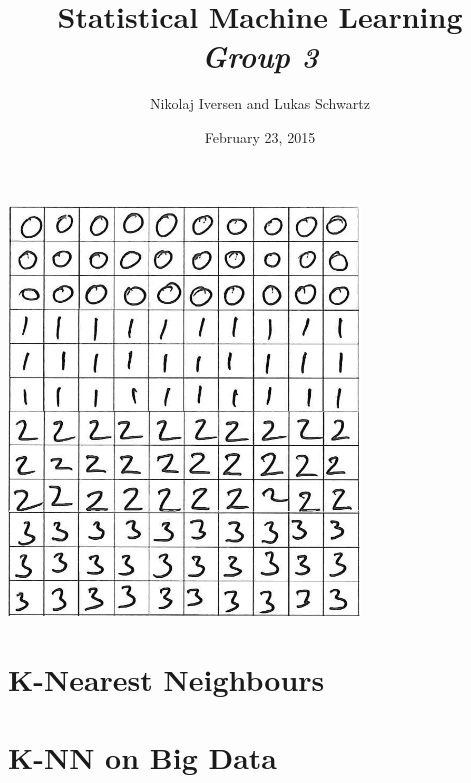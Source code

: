 \documentclass[12pt,a4paper]{article}
\begin{document}
\title{Statistical Machine Learning\\{\large\emph{Group 3}}}
\author{Nikolaj Iversen and Lukas Schwartz}
\date{February 23, 2015}
\maketitle

\vfill
\begin{center}
\includegraphics[width=0.7\textwidth]{graphics/digit_example}
\end{center}

\newpage

\tableofcontents
\listoffigures
\listoftables

\newpage


\section{K-Nearest Neighbours}

% 


% 

% 

\section{K-NN on Big Data}







\end{document}
